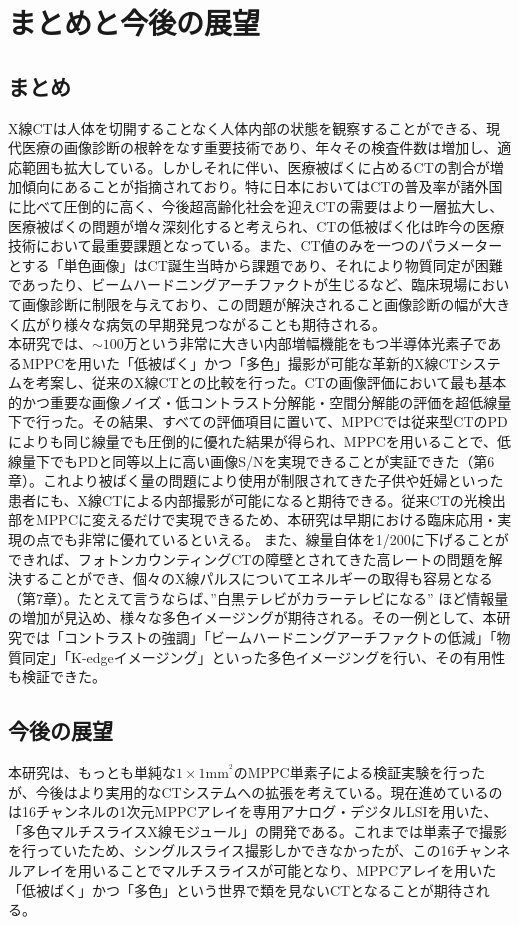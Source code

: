\chapter{まとめと今後の展望}
\section{まとめ}
X線CTは人体を切開することなく人体内部の状態を観察することができる、現代医療の画像診断の根幹をなす重要技術であり、年々その検査件数は増加し、適応範囲も拡大している。しかしそれに伴い、医療被ばくに占めるCTの割合が増加傾向にあることが指摘されており。特に日本においてはCTの普及率が諸外国に比べて圧倒的に高く、今後超高齢化社会を迎えCTの需要はより一層拡大し、医療被ばくの問題が増々深刻化すると考えられ、CTの低被ばく化は昨今の医療技術において最重要課題となっている。また、CT値のみを一つのパラメーターとする「単色画像」はCT誕生当時から課題であり、それにより物質同定が困難であったり、ビームハードニングアーチファクトが生じるなど、臨床現場において画像診断に制限を与えており、この問題が解決されること画像診断の幅が大きく広がり様々な病気の早期発見つながることも期待される。\\
本研究では、$\sim100万$という非常に大きい内部増幅機能をもつ半導体光素子であるMPPCを用いた「低被ばく」かつ「多色」撮影が可能な革新的X線CTシステムを考案し、従来のX線CTとの比較を行った。CTの画像評価において最も基本的かつ重要な画像ノイズ・低コントラスト分解能・空間分解能の評価を超低線量下で行った。その結果、すべての評価項目に置いて、MPPCでは従来型CTのPDによりも同じ線量でも圧倒的に優れた結果が得られ、MPPCを用いることで、低線量下でもPDと同等以上に高い画像S/Nを実現できることが実証できた（第6章）。これより被ばく量の問題により使用が制限されてきた子供や妊婦といった患者にも、X線CTによる内部撮影が可能になると期待できる。従来CTの光検出部をMPPCに変えるだけで実現できるため、本研究は早期における臨床応用・実現の点でも非常に優れているといえる。
また、線量自体を1/200に下げることができれば、フォトンカウンティングCTの障壁とされてきた高レートの問題を解決することができ、個々のX線パルスについてエネルギーの取得も容易となる（第7章）。たとえて言うならば、”白黒テレビがカラーテレビになる” ほど情報量の増加が見込め、様々な多色イメージングが期待される。その一例として、本研究では「コントラストの強調」「ビームハードニングアーチファクトの低減」「物質同定」「K-edgeイメージング」といった多色イメージングを行い、その有用性も検証できた。


\section{今後の展望}
本研究は、もっとも単純な$1\times1$mm$^^2$のMPPC単素子による検証実験を行ったが、今後はより実用的なCTシステムへの拡張を考えている。現在進めているのは16チャンネルの1次元MPPCアレイを専用アナログ・デジタルLSIを用いた、「多色マルチスライスX線モジュール」の開発である。これまでは単素子で撮影を行っていたため、シングルスライス撮影しかできなかったが、この16チャンネルアレイを用いることでマルチスライスが可能となり、MPPCアレイを用いた「低被ばく」かつ「多色」という世界で類を見ないCTとなることが期待される。\\

